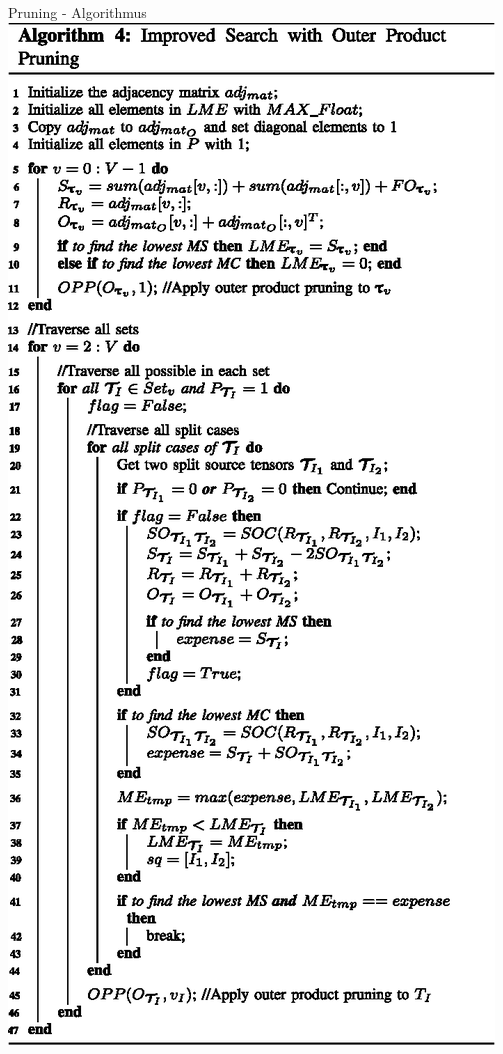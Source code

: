 \documentclass{beamer}
\begin{document}
\begin{frame}{Pruning - Algorithmus}
	\includegraphics[scale=.42]{algorithm_04}
\end{frame}
\end{document}
